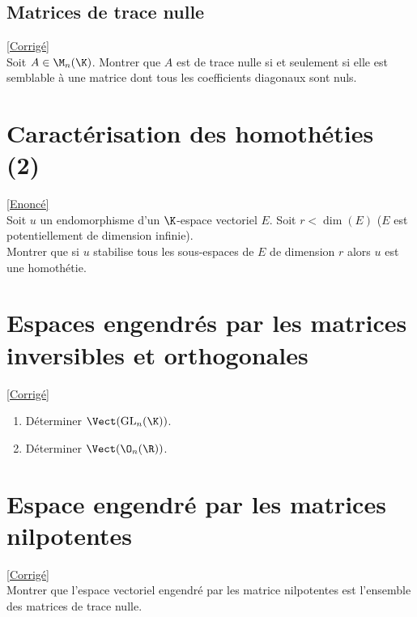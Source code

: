 \documentclass[8pt]{book}
\begin{document}
\subsection{Matrices de trace nulle}
\label{Matrices de trace nulle}
\textcolor{blue}{\hyperref[Matrices de trace nulle corrigé]{[Corrigé]}}\\
Soit $A\in \M_n(\K)$. Montrer que $A$ est de trace nulle si et seulement si elle est semblable à une matrice dont tous les coefficients diagonaux sont nuls.

\section{Caractérisation des homothéties (2) }
\label{Caractérisation des homothéties (2)}
\textcolor{blue}{\hyperref[Caractérisation des homothéties (2) corrigé]{[Enoncé]}}\\
Soit $u$ un endomorphisme d'un $\K$-espace vectoriel $E$. Soit $r<\dim(E)$ ($E$ est potentiellement de dimension infinie).\\
Montrer que si $u$ stabilise tous les sous-espaces de $E$ de dimension $r$ alors $u$ est une homothétie.

\section{Espaces engendrés par les matrices inversibles et orthogonales }
\label{Espaces engendrés par les matrices inversibles et orthogonales}
\textcolor{blue}{\hyperref[Espaces engendrés par les matrice inversibles et orthogonales corrigé]{[Corrigé]}}\\
\begin{enumerate}[leftmargin=*]
	\item Déterminer $\Vect(\text{GL}_n(\K))$.
	\item Déterminer $\Vect(\O_n(\R))$.
\end{enumerate}
	
\section{Espace engendré par les matrices nilpotentes }
\label{Espace engendré par les matrices nilpotentes}
\textcolor{blue}{\hyperref[Espace engendré par les matrices nilpotentes corrigé]{[Corrigé]}}\\
Montrer que l'espace vectoriel engendré par les matrice nilpotentes est l'ensemble des matrices de trace nulle.
\end{document}
